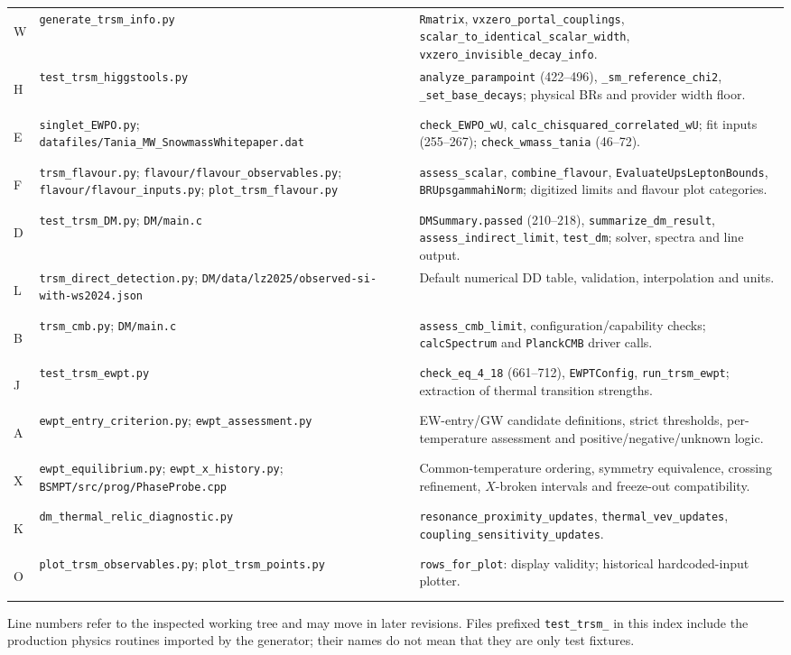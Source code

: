 \documentclass[11pt,a4paper]{article}
\newcommand{\code}[1]{\ifmmode\mbox{\ttfamily\detokenize{#1}}\else\nolinkurl{#1}\fi}
\begin{document}
\begin{longtable}{@{}p{}p{}p{}@{}}
\hypertarget{src:W}{W} & \code{generate_trsm_info.py} &
\code{Rmatrix}, \code{vxzero_portal_couplings},
\code{scalar_to_identical_scalar_width}, \code{vxzero_invisible_decay_info}.\\
\hypertarget{src:H}{H} & \code{test_trsm_higgstools.py} &
\code{analyze_parampoint} (422--496), \code{_sm_reference_chi2},
\code{_set_base_decays}; physical BRs and provider width floor.\\
\hypertarget{src:E}{E} & \code{singlet_EWPO.py}; \code{datafiles/Tania_MW_SnowmassWhitepaper.dat} &
\code{check_EWPO_wU}, \code{calc_chisquared_correlated_wU}; fit inputs
(255--267); \code{check_wmass_tania} (46--72).\\
\hypertarget{src:F}{F} & \code{trsm_flavour.py}; \code{flavour/flavour_observables.py};
\code{flavour/flavour_inputs.py}; \code{plot_trsm_flavour.py} &
\code{assess_scalar}, \code{combine_flavour},
\code{EvaluateUpsLeptonBounds}, \code{BRUpsgammahiNorm};
digitized limits and flavour plot categories.\\
\hypertarget{src:D}{D} & \code{test_trsm_DM.py}; \code{DM/main.c} &
\code{DMSummary.passed} (210--218), \code{summarize_dm_result},
\code{assess_indirect_limit}, \code{test_dm}; solver, spectra and line output.\\
\hypertarget{src:L}{L} & \code{trsm_direct_detection.py};
\code{DM/data/lz2025/observed-si-with-ws2024.json} &
Default numerical DD table, validation, interpolation and units.\\
\hypertarget{src:B}{B} & \code{trsm_cmb.py}; \code{DM/main.c} &
\code{assess_cmb_limit}, configuration/capability checks;
\code{calcSpectrum} and \code{PlanckCMB} driver calls.\\
\hypertarget{src:J}{J} & \code{test_trsm_ewpt.py} &
\code{check_eq_4_18} (661--712), \code{EWPTConfig},
\code{run_trsm_ewpt}; extraction of thermal transition strengths.\\
\hypertarget{src:A}{A} & \code{ewpt_entry_criterion.py}; \code{ewpt_assessment.py} &
EW-entry/GW candidate definitions, strict thresholds, per-temperature
assessment and positive/negative/unknown logic.\\
\hypertarget{src:X}{X} & \code{ewpt_equilibrium.py}; \code{ewpt_x_history.py};
\code{BSMPT/src/prog/PhaseProbe.cpp} &
Common-temperature ordering, symmetry equivalence, crossing refinement,
$X$-broken intervals and freeze-out compatibility.\\
\hypertarget{src:K}{K} & \code{dm_thermal_relic_diagnostic.py} &
\code{resonance_proximity_updates}, \code{thermal_vev_updates},
\code{coupling_sensitivity_updates}.\\
\hypertarget{src:O}{O} & \code{plot_trsm_observables.py}; \code{plot_trsm_points.py} &
\code{rows_for_plot}: display validity; historical hardcoded-input plotter.\\
\bottomrule
\end{longtable}
\normalsize
Line numbers refer to the inspected working tree and may move in later
revisions. Files prefixed \code{test_trsm_} in this index include the
production physics routines imported by the generator; their names do not
mean that they are only test fixtures.
\end{document}
